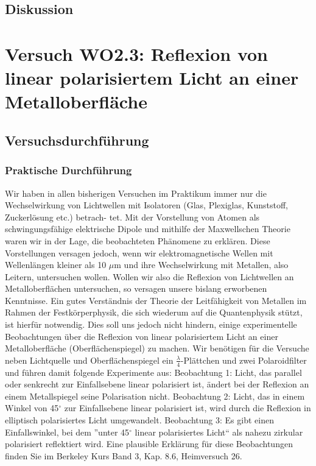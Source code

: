 \documentclass[12pt]{scrartcl}
\begin{document}
\subsection{Diskussion}

\section{Versuch WO2.3:
Reflexion von linear polarisiertem Licht an einer Metalloberfläche}
\subsection{Versuchsdurchführung}
\subsubsection{Praktische Durchführung}
Wir haben in allen bisherigen Versuchen im Praktikum immer nur die Wechselwirkung
von Lichtwellen mit Isolatoren (Glas, Plexiglas, Kunststoff, Zuckerlösung etc.) betrach-
tet. Mit der Vorstellung von Atomen als schwingungsfähige elektrische Dipole und mithilfe der Maxwellschen Theorie waren wir in der Lage, die beobachteten Phänomene zu erklären. Diese Vorstellungen versagen jedoch, wenn wir elektromagnetische Wellen mit Wellenlängen kleiner als 10 $\mu$m und ihre Wechselwirkung mit Metallen, also Leitern, untersuchen wollen. Wollen wir also die Reflexion von Lichtwellen an Metalloberflächen untersuchen, so versagen unsere bislang erworbenen Kenntnisse. Ein gutes Verständnis der Theorie der Leitfähigkeit von Metallen im Rahmen der Festkörperphysik, die sich wiederum auf die Quantenphysik stützt, ist hierfür notwendig. Dies soll uns jedoch nicht hindern, einige experimentelle Beobachtungen über die Reflexion von linear polarisiertem Licht an einer Metalloberfläche (Oberflächenspiegel) zu machen. Wir benötigen für die Versuche neben Lichtquelle und Oberflächenspiegel ein
$\frac{\lambda}{4}$-Plättchen und zwei Polaroidfilter und
führen damit folgende Experimente aus:
Beobachtung 1: Licht, das parallel oder senkrecht zur Einfallsebene linear polarisiert ist, ändert bei der Reflexion an einem Metallspiegel seine Polarisation nicht.
Beobachtung 2: Licht, das in einem Winkel von 45$^\circ$ zur Einfallsebene linear polarisiert ist, wird durch die Reflexion in elliptisch polarisiertes Licht umgewandelt.
Beobachtung 3: Es gibt einen Einfallswinkel, bei dem
”unter 45$^\circ$
linear polarisiertes
Licht“ als nahezu zirkular polarisiert reflektiert wird.
Eine plausible Erklärung für diese Beobachtungen finden Sie im Berkeley Kurs Band 3, Kap. 8.6, Heimversuch 26.
\end{document}
